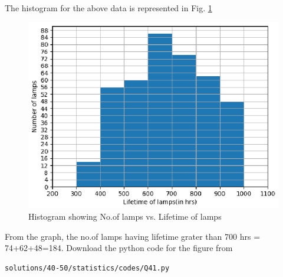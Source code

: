  The histogram for the above data is represented in Fig. \ref{fig:41_stats_histogram}
\begin{figure}[!ht]
\centering
\includegraphics[width= \columnwidth]{./solutions/40-50/statistics/figs/Q41.eps}
\caption{Histogram showing No.of lamps vs. Lifetime of lamps}
\label{fig:41_stats_histogram}
\end{figure}
 From the graph, the no.of lamps having lifetime grater than 700 hrs = 74+62+48=184.
 Download the python code for the figure from
\begin{lstlisting}
solutions/40-50/statistics/codes/Q41.py
\end{lstlisting}

